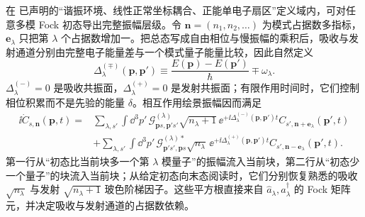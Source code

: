 在 已声明的“谐振环境、线性正常坐标耦合、正能单电子扇区”定义域内，可对任意多模 Fock 初态导出完整振幅层级。令 $\mathbf n=(n_1,n_2,\ldots)$ 为模式占据数多指标，$\mathbf e_\lambda$ 只把第 $\lambda$ 个占据数增加一。把总态写成自由相位与慢振幅的乘积后，吸收与发射通道分别由完整电子能量差与一个模式量子能量比较，因此自然定义
\[
\Delta^{(\mp)}_\lambda(\mathbf p,\mathbf p')
\equiv
\frac{E(\mathbf p)-E(\mathbf p')}{\hbar}\mp\omega_\lambda .
\]
$\Delta^{(-)}_\lambda=0$ 是吸收共振面，$\Delta^{(+)}_\lambda=0$ 是发射共振面；有限作用时间时，它们控制相位积累而不是先验的能量 $\delta$。相互作用绘景振幅因而满足
\begin{equation}
\boxed{
\begin{aligned}
\ii\dot C_{s,\mathbf n}(\mathbf p,t)
={}&\sum_{\lambda,s'}\int\dd^3 p'\,
\mathcal G^{(\lambda)}_{\mathbf p s,\mathbf p's'}
\sqrt{n_\lambda+1}\,
\ee^{+\ii\Delta^{(-)}_{\lambda}(\mathbf p,\mathbf p')t}
C_{s',\mathbf n+\mathbf e_\lambda}(\mathbf p',t)\\
&+\sum_{\lambda,s'}\int\dd^3 p'\,
\mathcal G^{(\lambda)*}_{\mathbf p's',\mathbf p s}
\sqrt{n_\lambda}\,
\ee^{+\ii\Delta^{(+)}_{\lambda}(\mathbf p,\mathbf p')t}
C_{s',\mathbf n-\mathbf e_\lambda}(\mathbf p',t).
\end{aligned}}
\label{eq:universal_multiboson_amplitude_hierarchy}
\end{equation}
第一行从“初态比当前块多一个第 $\lambda$ 模量子”的振幅流入当前块，第二行从“初态少一个量子”的块流入当前块；从给定初态向末态阅读时，它们分别恢复熟悉的吸收 $\sqrt{n_\lambda}$ 与发射 $\sqrt{n_\lambda+1}$ 玻色阶梯因子。这些平方根直接来自 $\hat a_\lambda,\hat a_\lambda^\dagger$ 的 Fock 矩阵元，并决定吸收与发射通道的占据数依赖。

